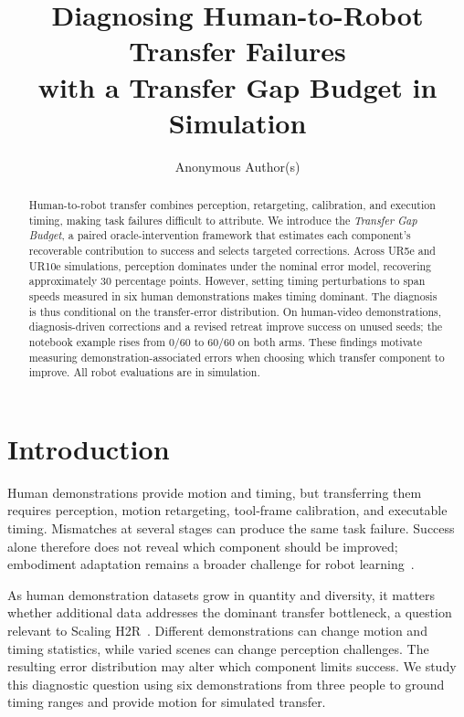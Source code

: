 \documentclass{article}
\title{Diagnosing Human-to-Robot Transfer Failures\\with a Transfer Gap Budget in Simulation}
\author{Anonymous Author(s)}
\begin{document}
\maketitle

\begin{abstract}
Human-to-robot transfer combines perception, retargeting, calibration, and execution timing, making task failures difficult to attribute. We introduce the \emph{Transfer Gap Budget}, a paired oracle-intervention framework that estimates each component's recoverable contribution to success and selects targeted corrections. Across UR5e and UR10e simulations, perception dominates under the nominal error model, recovering approximately 30 percentage points. However, setting timing perturbations to span speeds measured in six human demonstrations makes timing dominant. The diagnosis is thus conditional on the transfer-error distribution. On human-video demonstrations, diagnosis-driven corrections and a revised retreat improve success on unused seeds; the notebook example rises from 0/60 to 60/60 on both arms. These findings motivate measuring demonstration-associated errors when choosing which transfer component to improve. All robot evaluations are in simulation.
\end{abstract}


\section{Introduction}

Human demonstrations provide motion and timing, but transferring them requires perception, motion retargeting, tool-frame calibration, and executable timing. Mismatches at several stages can produce the same task failure. Success alone therefore does not reveal which component should be improved; embodiment adaptation remains a broader challenge for robot learning~\citep{domae2026embodimentgap}.

As human demonstration datasets grow in quantity and diversity, it matters whether additional data addresses the dominant transfer bottleneck, a question relevant to Scaling H2R~\citep{scalingh2r}. Different demonstrations can change motion and timing statistics, while varied scenes can change perception challenges. The resulting error distribution may alter which component limits success. We study this diagnostic question using six demonstrations from three people to ground timing ranges and provide motion for simulated transfer.
\end{document}

